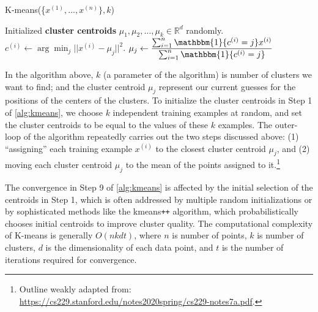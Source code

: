 \documentclass{article}
\begin{document}
  \begin{algorithm}[H]
    \caption{{\sc K-means}(\{$x^{(1)}, \ldots, x^{(n)}\}, k$)}
    \label{alg:kmeans}
    \begin{algorithmic}[1]
      \State
        Initialized {\bf cluster centroids} $\mu_1, \mu_2, \ldots, \mu_k \in
        \mathbb{R}^d$ randomly.
      \Repeat
          \State $c^{(i)} \gets \displaystyle\arg\min_{j} || x^{(i)} - \mu_j ||^2$.
        \EndFor
          \State $\mu_j \gets \displaystyle\frac{\sum_{i=1}^n \mathbbm{1}\{c^{(i)}
          = j\}x^{(i)}}{\sum_{i=1}^n \mathbbm{1}\{c^{(i)} = j\}}$
        \EndFor
    \end{algorithmic}
  \end{algorithm}

  In the algorithm above, $k$ (a parameter of the algorithm) is number of clusters
  we want to find; and the cluster centroid $\mu_j$ represent our current guesses
  for the positions of the centers of the clusters. To initialize the cluster
  centroids in Step 1 of \autoref{alg:kmeans}, we choose $k$ independent training
  examples at random, and set the cluster centroids to be equal to the values of
  these $k$ examples. The outer-loop of the algorithm repeatedly carries out the
  two steps discussed above: (1) ``assigning'' each training example $x^{(i)}$ to
  the closest cluster centroid $\mu_j$, and (2) moving each cluster centroid $\mu_j$
  to the mean of the points assigned to it.\footnote{
    Outline weakly adapted from: \url{https://cs229.stanford.edu/notes2020spring/cs229-notes7a.pdf}.
  } \medskip

  The convergence in Step 9 of \autoref{alg:kmeans} is affected by the initial
  selection of the centroids in Step 1, which is  often addressed by multiple
  random initializations or by sophisticated methods like the kmeans{\tt ++}
  algorithm, which probabilistically chooses initial centroids to improve cluster
  quality. The computational complexity of {\sc K-means} is generally $O(nkdt)$,
  where $n$ is number of points, $k$ is number of clusters, $d$ is the dimensionality
  of each data point, and $t$ is the number of iterations required for convergence. 
  \medskip
\end{document}
